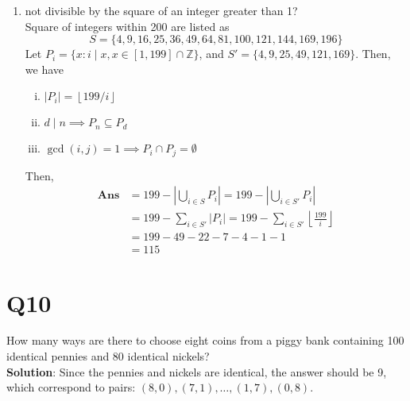 \documentclass[a4paper,11pt]{article}
\newenvironment{qparts}{\begin{enumerate}[{(}a{)}]}{\end{enumerate}}
\newenvironment{solution}{{\\\bf Solution}:}{\smallskip}
\begin{document}
\begin{qparts}
    Therefore, $\textbf{Ans}=\left\vert A \cup B  \right\vert =
    \left\vert A \right\vert +\left\vert B \right\vert -\left\vert A \cap B  \right\vert =46+20=66$.


    \item not divisible by the square of an integer greater than 1?\\
    Square of integers within 200 are listed as $$S=\{ 4,9,16, 25, 36 ,49 ,
    64 , 81, 100, 121 , 144 , 169 , 196 \}$$
    Let $P_{i }=\{ x\colon i \mid x, x \in [1,199]\cap \mathbb{Z} \}$,
    and $S'=\{ 4,9,25,49 ,121 ,169 \}$. 
    Then, we have 
    \begin{enumerate}[i. ]
        
        \item $\left\vert P_{i } \right\vert =\left\lfloor 199 / i \right\rfloor$
        \item $d \mid n \implies P_{n} \subseteq P_{d}$
        \item $\operatorname{gcd}(i,j)=1\implies P_{i }\cap P_{j }=\emptyset$
    \end{enumerate}
    Then,
    \begin{align*}
        \textbf{Ans}&=199-\left\vert \bigcup_{i \in  S}P_{i}  \right\vert 
                =199-\left\vert \bigcup_{i \in  S'} P_{i } \right\vert \\
                &=199-\sum_{i \in S'}\left\vert P_{i } \right\vert 
                =199-\sum_{i \in S'}\left\lfloor \frac{199}{i} \right\rfloor\\
                &=199-49-22-7-4-1-1\\
                &=115
    \end{align*}
\end{qparts}

\section*{Q10}
How many ways are there to choose eight coins from a piggy bank containing 100 identical pennies and 80 identical nickels?
\begin{solution}
    Since the pennies and nickels are identical, the answer should 
    be 9, which correspond to pairs: $(8,0),(7,1), \ldots ,(1,7),(0,8)$.
\end{solution}
\end{document}
